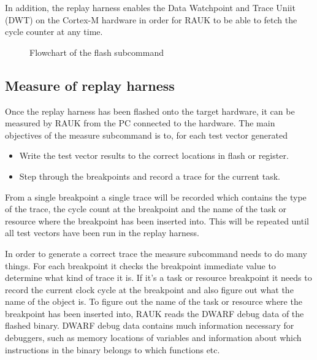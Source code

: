 In addition, the replay harness enables the Data Watchpoint and Trace Uniit
(DWT) on the Cortex-M hardware in order for RAUK to be able to fetch the cycle
counter at any time.

\begin{figure}[H]
    \centering
    \caption{Flowchart of the flash subcommand}
    \label{fig:flashcmd}
\end{figure}

\subsection{Measure of replay harness}
Once the replay harness has been flashed onto the target hardware, it can
be measured by RAUK from the PC connected to the hardware. The main objectives
of the measure subcommand is to, for each test vector generated
\begin{itemize}
   \item Write the test vector results to the correct locations in flash or register.
   \item Step through the breakpoints and record a trace for the current task.
\end{itemize}
From a single breakpoint a single trace will be recorded which contains the
type of the trace, the cycle count at the breakpoint and the name of the task
or resource where the breakpoint has been inserted into. This will be repeated
until all test vectors have been run in the replay harness.

In order to generate a correct trace the measure subcommand needs to do many
things. For each breakpoint it checks the breakpoint immediate value to
determine what kind of trace it is. If it's a task or resource breakpoint it
needs to record the current clock cycle at the breakpoint and also figure out
what the name of the object is. To figure out the name of the task or resource
where the breakpoint has been inserted into, RAUK reads the
DWARF\cite{dwarfspec} debug data of the flashed binary. DWARF debug data
contains much information necessary for debuggers, such as memory locations of
variables and information about which instructions in the binary belongs to
which functions etc.

